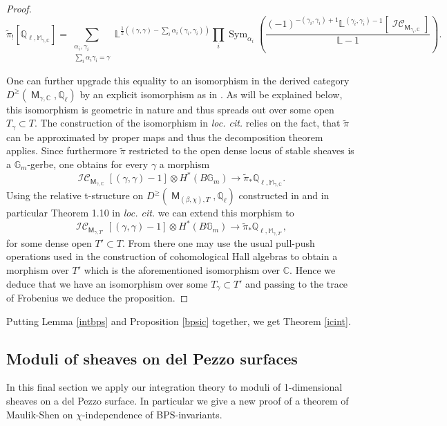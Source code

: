 \documentclass{article}
\DeclareMathOperator{\M}{{\mathsf{M}}}
\DeclareMathOperator{\Sym}{Sym}
\DeclareMathOperator{\CIC}{\mathcal{IC}}
\newcommand{\BC}{{\mathbb{C}}}
\newcommand{\BG}{{\mathbb{G}}}
\newcommand{\BL}{{\mathbb{L}}}
\newcommand{\BM}{{\mathbb{M}}}
\newcommand{\BQ}{{\mathbb{Q}}}
\theoremstyle{definition}
\theoremstyle{plain}
\begin{document}
\begin{proof}
\begin{equation} \tilde{\pi}_{!}[\BQ_{\ell,\BM_{\gamma,\BC}}]= \sum_{\substack{\alpha_i,\gamma_i\\ \sum_i \alpha_i\gamma_i = \gamma}} \BL^{\frac{1}{2}\left((\gamma,\gamma) - \sum_i \alpha_i (\gamma_i,\gamma_i) \right)}  \prod_i \Sym_{\alpha_i}\left(\frac{ (-1)^{-(\gamma_i,\gamma_i)+1}\BL^{(\gamma_i,\gamma_i)-1}[\CIC_{\M_{\gamma_i,\BC}}]}{\BL-1} \right) . \end{equation}


 One can further upgrade this equality to an isomorphism in the derived category $D^{\geq}(\M_{\gamma,\BC},\BQ_\ell)$ by an explicit isomorphism as in \cite[Theorem C]{DM20}. As will be explained below, this isomorphism is geometric in nature and thus spreads out over some open $T_\gamma \subset T$. The construction of the isomorphism in \textit{loc. cit.} relies on the fact, that $\tilde \pi$ can be approximated by proper maps and thus the decomposition theorem applies. Since furthermore $\tilde \pi$ restricted to the open dense locus of stable sheaves is a $\BG_m$-gerbe, one obtains for every $\gamma$ a morphism
\[ \CIC_{\M_{\gamma,\BC}}[(\gamma,\gamma)-1] \otimes H^*(B\BG_m) \to  \tilde{\pi}_* \BQ_{\ell,\BM_{\gamma,\BC}}.  \]
Using the relative t-structure on $D^{\geq}(\M_{(\beta,\chi),T},\BQ_\ell)$ constructed in \cite{HS23} and in particular Theorem 1.10 in \textit{loc. cit.} we can extend this morphism to 
\[ \CIC_{\M_{\gamma,T'}}[(\gamma,\gamma)-1] \otimes H^*(B\BG_m) \to  \tilde{\pi}_* \BQ_{\ell,\BM_{\gamma,T'}},  \]
for some dense open $T' \subset T$. From there one may use the usual pull-push operations used in the construction of cohomological Hall algebras to obtain a morphism over $T'$ which is the aforementioned isomorphism over $\BC$. Hence we deduce that we have an isomorphism over some $T_\gamma \subset T'$ and passing to the trace of Frobenius we deduce the proposition.
\end{proof}

Putting Lemma \ref{intbps} and Proposition \ref{bpsic} together, we get Theorem \ref{icint}.

\subsection{Moduli of sheaves on del Pezzo surfaces}





In this final section we apply our integration theory to moduli of 1-dimensional sheaves on a del Pezzo surface. In particular we give a new proof of a theorem of Maulik-Shen \cite{MS20} on $\chi$-independence of BPS-invariants.
\end{document}
